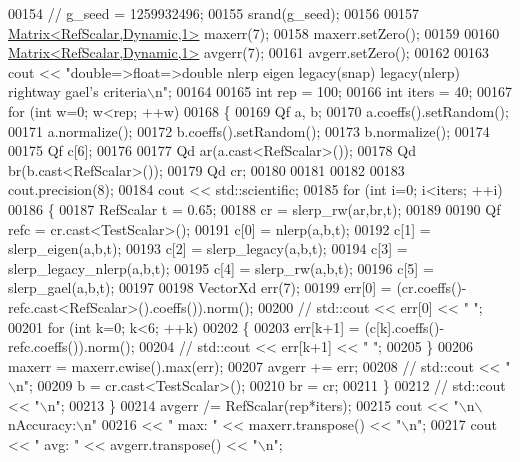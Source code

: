 \begin{DoxyCode}
00154 \textcolor{comment}{//   g\_seed = 1259932496;}
00155   srand(g\_seed);
00156   
00157   \hyperlink{group___core___module_class_eigen_1_1_matrix}{Matrix<RefScalar,Dynamic,1>} maxerr(7);
00158   maxerr.setZero();
00159   
00160   \hyperlink{group___core___module_class_eigen_1_1_matrix}{Matrix<RefScalar,Dynamic,1>} avgerr(7);
00161   avgerr.setZero();
00162   
00163   cout << \textcolor{stringliteral}{"double=>float=>double       nlerp        eigen        legacy(snap)         legacy(nlerp)       
       rightway         gael's criteria\(\backslash\)n"};
00164   
00165   \textcolor{keywordtype}{int} rep = 100;
00166   \textcolor{keywordtype}{int} iters = 40;
00167   \textcolor{keywordflow}{for} (\textcolor{keywordtype}{int} w=0; w<rep; ++w)
00168   \{
00169     Qf a, b;
00170     a.coeffs().setRandom();
00171     a.normalize();
00172     b.coeffs().setRandom();
00173     b.normalize();
00174     
00175     Qf c[6];
00176     
00177     Qd ar(a.cast<RefScalar>());
00178     Qd br(b.cast<RefScalar>());
00179     Qd cr;
00180     
00181     
00182     
00183     cout.precision(8);
00184     cout << std::scientific;
00185     \textcolor{keywordflow}{for} (\textcolor{keywordtype}{int} i=0; i<iters; ++i)
00186     \{
00187       RefScalar t = 0.65;
00188       cr = slerp\_rw(ar,br,t);
00189       
00190       Qf refc = cr.cast<TestScalar>();
00191       c[0] = nlerp(a,b,t);
00192       c[1] = slerp\_eigen(a,b,t);
00193       c[2] = slerp\_legacy(a,b,t);
00194       c[3] = slerp\_legacy\_nlerp(a,b,t);
00195       c[4] = slerp\_rw(a,b,t);
00196       c[5] = slerp\_gael(a,b,t);
00197       
00198       VectorXd err(7);
00199       err[0] = (cr.coeffs()-refc.cast<RefScalar>().coeffs()).norm();
00200 \textcolor{comment}{//       std::cout << err[0] << "    ";}
00201       \textcolor{keywordflow}{for} (\textcolor{keywordtype}{int} k=0; k<6; ++k)
00202       \{
00203         err[k+1] = (c[k].coeffs()-refc.coeffs()).norm();
00204 \textcolor{comment}{//         std::cout << err[k+1] << "    ";}
00205       \}
00206       maxerr = maxerr.cwise().max(err);
00207       avgerr += err;
00208 \textcolor{comment}{//       std::cout << "\(\backslash\)n";}
00209       b = cr.cast<TestScalar>();
00210       br = cr;
00211     \}
00212 \textcolor{comment}{//     std::cout << "\(\backslash\)n";}
00213   \}
00214   avgerr /= RefScalar(rep*iters);
00215   cout << \textcolor{stringliteral}{"\(\backslash\)n\(\backslash\)nAccuracy:\(\backslash\)n"}
00216        << \textcolor{stringliteral}{"  max: "} << maxerr.transpose() << \textcolor{stringliteral}{"\(\backslash\)n"};
00217   cout << \textcolor{stringliteral}{"  avg: "} << avgerr.transpose() << \textcolor{stringliteral}{"\(\backslash\)n"};

\end{DoxyCode}

